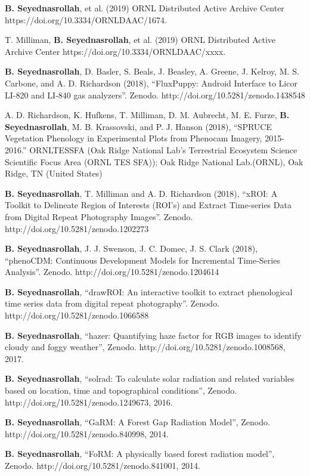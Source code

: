 \documentclass[10pt]{article}
\newenvironment{changemargin}[2]{%
  \begin{list}{}{%
    \setlength{\topsep}{0pt}%
    \setlength{\leftmargin}{#1}%
    \setlength{\rightmargin}{#2}%
    \setlength{\listparindent}{\parindent}%
    \setlength{\itemindent}{\parindent}%
    \setlength{\parsep}{\parskip}%
  }%
  \item[]}{\end{list}
}
\newenvironment{body} {
	\vspace*{-2pt}
	\begin{changemargin}{-0.5in}{-0.5in}
  }
	{\end{changemargin}
}
\begin{document}
\begin{body}

\textbf{B. Seyednasrollah}, et al. (2019) ORNL Distributed Active Archive Center https://doi.org/10.3334/ORNLDAAC/1674. 
\\ \medskip

T. Milliman, \textbf{B. Seyednasrollah}, et al. (2019) ORNL Distributed Active Archive Center https://doi.org/10.3334/ORNLDAAC/xxxx. 
\\ \medskip

\textbf{B. Seyednasrollah}, D. Basler, S. Beals, J. Beasley, A. Greene, J. Kelroy, M. S. Carbone, and A. D. Richardson (2018), ``FluxPuppy: Android Interface to Licor LI-820 and LI-840 gas analyzers''. Zenodo. http://doi.org/10.5281/zenodo.1438548\\ \medskip

A. D. Richardson, K. Hufkens, T. Milliman, D. M. Aubrecht, M. E. Furze, \textbf{B. Seyednasrollah}, M. B. Krassovski, and P. J. Hanson (2018), ``SPRUCE Vegetation Phenology in Experimental Plots from Phenocam Imagery, 2015-2016.'' ORNLTESSFA (Oak Ridge National Lab's Terrestrial Ecosystem Science Scientific Focus Area (ORNL TES SFA)); Oak Ridge National Lab.(ORNL), Oak Ridge, TN (United States)\\ \medskip

\textbf{B. Seyednasrollah}, T. Milliman and A. D. Richardson (2018),  ``xROI: A Toolkit to Delineate Region of Interests (ROI's) and Extract Time-series Data from Digital Repeat Photography Images''. Zenodo. http://doi.org/10.5281/zenodo.1202273\\ \medskip

\textbf{B. Seyednasrollah}, J. J. Swenson, J. C. Domec, J. S. Clark (2018),  ``phenoCDM: Continuous Development Models for Incremental Time-Series Analysis''. Zenodo. http://doi.org/10.5281/zenodo.1204614\\ \medskip

\textbf{B. Seyednasrollah},  ``drawROI: An interactive toolkit to extract phenological time series data from digital repeat photography''. Zenodo. http://doi.org/10.5281/zenodo.1066588\\ \medskip

   \textbf{B. Seyednasrollah}, ``hazer: Quantifying haze factor for RGB images to identify cloudy and foggy weather'', Zenodo. http://doi.org/10.5281/zenodo.1008568, 2017. \\ \medskip

   \textbf{B. Seyednasrollah}, ``solrad: To calculate solar radiation and related variables based on location, time and topographical conditions'', Zenodo. http://doi.org/10.5281/zenodo.1249673, 2016. \\ \medskip

   \textbf{B. Seyednasrollah}, ``GaRM: A Forest Gap Radiation Model'', Zenodo. http://doi.org/10.5281/zenodo.840998, 2014. \\ \medskip

   \textbf{B. Seyednasrollah}, ``FoRM: A physically based forest radiation model'', Zenodo. http://doi.org/10.5281/zenodo.841001, 2014. \\
   \medskip

\end{body}
\end{document}
